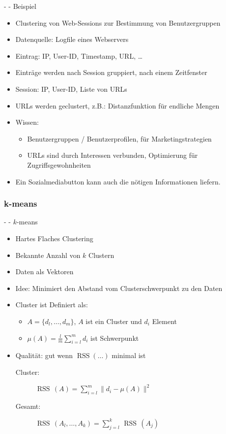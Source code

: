 \documentclass[fleqn,11pt,aspectratio=43]{beamer}
\DeclareMathOperator{\RSS}{RSS}
\begin{document}
\begin{frame}{\insertsectionhead - \insertsubsectionhead - Beispiel \cite{ester2000knowledge}}
\begin{itemize} %
\item Clustering von Web-Sessions zur Bestimmung von Benutzergruppen
\item Datenquelle: Logfile eines Webservers
\item Eintrag: IP, User-ID, Timestamp, URL, \ldots
\item Einträge werden nach Session gruppiert, nach einem Zeitfenster
\item Session: IP, User-ID, Liste von URLs
\item URLs werden geclustert, z.B.: Distanzfunktion für endliche Mengen
\item Wissen:
\begin{itemize}
\item Benutzergruppen / Benutzerprofilen, für Marketingstrategien 
\item URLs sind durch Interessen verbunden, Optimierung für Zugriffsgewohnheiten 
\end{itemize}
\item Ein Sozialmediabutton kann auch die nötigen Informationen liefern.
\end{itemize}
\end{frame}


\subsubsection{k-means~}\label{kmeans}

\begin{frame}{\insertsectionhead - \insertsubsectionhead - $k$-means \cite{dwh}}
\begin{itemize}
\item Hartes Flaches Clustering
\item Bekannte Anzahl von $k$ Clustern
\item Daten als Vektoren
\item Idee: Minimiert den Abstand vom Clusterschwerpunkt zu den Daten
\item Cluster ist Definiert als:
\begin{itemize}
\item $A = \{d_l, \ldots, d_m\}$, $A$ ist ein Cluster und $d_i$ Element 
\item $\mu(A) = \frac{l}{m}\sum\limits_{i=l}^{m}{d_i}$ ist Schwerpunkt
\end{itemize}
\item Qualität: gut wenn $\RSS(\ldots)$ minimal ist
\begin{description}
\item[Cluster:] $\RSS\,(A) = \sum\limits_{i=l}^{m}\big\|d_i - \mu(A)\big\|^2$
\item[Gesamt:] $\RSS\,(A_l, \ldots, A_k) = \sum\limits_{j=l}^{k}\,\RSS\,(A_j)$
\end{description}
\end{itemize}
\end{frame}
\end{document}
